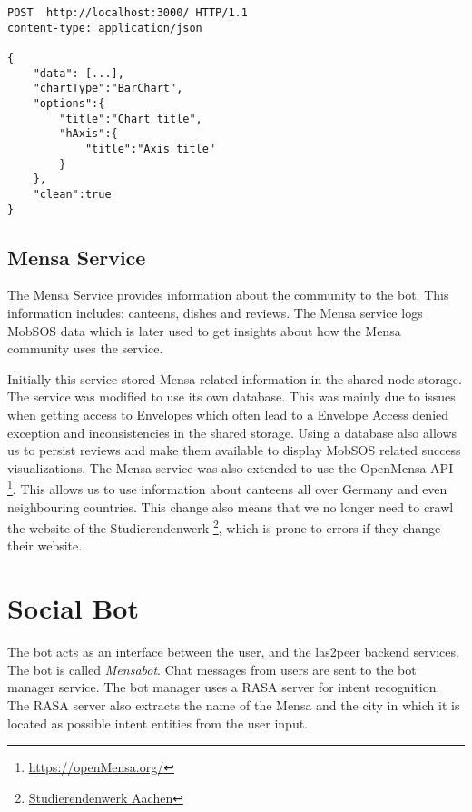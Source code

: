 \begin{lstlisting}
POST  http://localhost:3000/ HTTP/1.1
content-type: application/json

{
    "data": [...],
    "chartType":"BarChart",
    "options":{
        "title":"Chart title",
        "hAxis":{
            "title":"Axis title"
        }
    },
    "clean":true 
}
\end{lstlisting}

\subsection{Mensa Service}
The Mensa Service provides information about the community to the bot. This information includes: canteens, dishes and reviews. The Mensa service logs MobSOS data which is later used to get insights about how the Mensa community uses the service.

Initially this service stored Mensa related information in the shared node storage. The service was modified to use its own database. This was mainly due to issues when getting access to Envelopes which often lead to a Envelope Access denied exception and inconsistencies in the shared storage. Using a database also allows us to persist reviews and make them available to display MobSOS related success visualizations.
The Mensa service was also extended to use the OpenMensa API \footnote{\url{https://openMensa.org/}}. This allows us to use information about canteens all over Germany and even neighbouring countries.
This change also means that we no longer need to crawl the website of the Studierendenwerk \footnote{\href{https://www.studierendenwerk-aachen.de/}{Studierendenwerk Aachen}}, which is prone to errors if they change their website. 

\section{Social Bot}

The bot acts as an interface between the user, and the las2peer backend services. The bot is called \emph{Mensabot}.
Chat messages from users are sent to the bot manager service. 
The bot manager uses a RASA server for intent recognition. 
The RASA server also extracts the name of the Mensa and the city in which it is located as possible intent entities from the user input.

